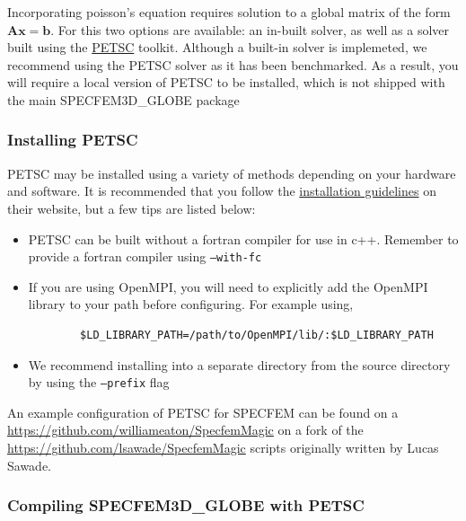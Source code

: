 Incorporating poisson's equation requires solution to a global matrix of the form $\mathbf{A}\mathbf{x} = \mathbf{b}$. 
For this two options are available: an in-built solver, as well as a solver built using the \href{http://petsc.org/release/}{PETSC} toolkit. 
Although a built-in solver is implemeted, we recommend using the PETSC solver as it has been benchmarked. As a result, 
you will require a local version of PETSC to be installed, which is not shipped with the main SPECFEM3D\_GLOBE package 


\subsubsection{Installing PETSC}
 
 PETSC may be installed using a variety of methods depending on your hardware and software. It is recommended that you follow
 the \href{https://petsc.org/release/install/}{installation guidelines} on their website, but a few tips are listed below: 
 
 \begin{itemize}
     \item PETSC can be built without a fortran compiler for use in c++. Remember to provide a fortran compiler using \texttt{--with-fc} 
     \item If you are using OpenMPI, you will need to explicitly add the OpenMPI library to your path before configuring. For example using, 
     \begin{verbatim}
        $LD_LIBRARY_PATH=/path/to/OpenMPI/lib/:$LD_LIBRARY_PATH
     \end{verbatim}
     \item We recommend installing into a separate directory from the source directory by using the \texttt{--prefix} flag
 \end{itemize}


 An example configuration of PETSC for SPECFEM can be found on a \href{here}{https://github.com/williameaton/SpecfemMagic} 
 on a fork of the \href{SpecfemMagic}{https://github.com/lsawade/SpecfemMagic} scripts originally written by Lucas Sawade. 
 
 
 \subsubsection{Compiling SPECFEM3D\_GLOBE with PETSC}
 
